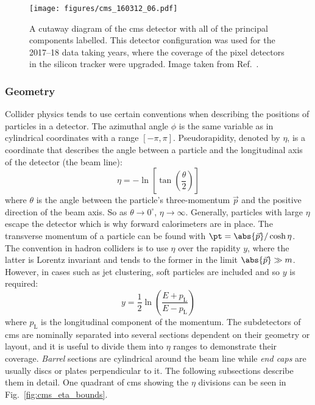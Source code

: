 \clearpage

\begin{figure}[htbp]
    \centering
    \texttt{[image: figures/cms\_160312\_06.pdf]}
    \caption[A cutaway diagram of the CMS detector for the 2017--18 data taking years, with all of the principal components labelled]{A cutaway diagram of the \acrshort{cms} detector with all of the principal components labelled. This detector configuration was used for the 2017--18 data taking years, where the coverage of the pixel detectors in the silicon tracker were upgraded. Image taken from Ref.~.}
    \label{fig:detector_cms_cutaway}
\end{figure}




\subsubsection{Geometry}
\label{subsubsec:geometry}

Collider physics tends to use certain conventions when describing the positions of particles in a detector. The azimuthal angle $\phi$ is the same variable as in cylindrical coordinates with a range $[-\pi, \pi]$. Pseudorapidity, denoted by $\eta$, is a coordinate that describes the angle between a particle and the longitudinal axis of the detector (the beam line):
\begin{equation}
    \eta = -\ln \left[ \tan(\frac{\theta}{2}) \right]
    \label{eq:eta_def}
\end{equation}
where $\theta$ is the angle between the particle's three-momentum $\vec{p}$ and the positive direction of the beam axis. So as $\theta \rightarrow \text{0}^{\circ}$, $\eta \rightarrow \infty$. Generally, particles with large $\eta$ escape the detector which is why forward calorimeters are in place. The transverse momentum of a particle can be found with $\pt = \abs{\vec{p}} / \cosh \eta$. The convention in hadron colliders is to use $\eta$ over the rapidity $y$, where the latter is Lorentz invariant and tends to the former in the limit $\abs{\vec{p}} \gg m$. However, in cases such as jet clustering, soft particles are included and so $y$ is required:
\begin{equation}
    y = \frac{1}{2} \ln (\frac{ E + p_{\mathrm{L}} }{ E - p_{\mathrm{L}} })
    \label{eq:rapidity_def}
\end{equation}
where $p_{\mathrm{L}}$ is the longitudinal component of the momentum. The subdetectors of \acrshort{cms} are nominally separated into several sections dependent on their geometry or layout, and it is useful to divide them into $\eta$ ranges to demonstrate their coverage. \emph{Barrel} sections are cylindrical around the beam line while \emph{end caps} are usually discs or plates perpendicular to it. The following subsections describe them in detail. One quadrant of \acrshort{cms} showing the $\eta$ divisions can be seen in Fig.~\ref{fig:cms_eta_bounds}.

